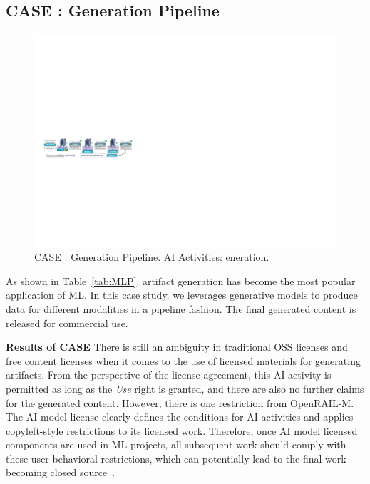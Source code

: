 \subsection{CASE  : Generation Pipeline}

\begin{figure}[h]
    \centering
    \includegraphics[width=\linewidth]{fig/case3.pdf}
    \caption{CASE : Generation Pipeline. AI Activities: eneration.}
    \Description{}
    \label{fig:case3}
\end{figure}

As shown in Table~\ref{tab:MLP}, artifact generation has become the most popular application of ML.
In this case study, we leverages generative models to produce data for different modalities in a pipeline fashion.
The final generated content is released for commercial use.

\textbf{Results of CASE }
There is still an ambiguity in traditional OSS licenses and free content licenses when it comes to the use of licensed materials for generating artifacts.
From the perspective of the license agreement, this AI activity is permitted as long as the \textit{Use} right is granted, and there are also no further claims for the generated content.
However, there is one restriction from OpenRAIL-M. 
The AI model license clearly defines the conditions for AI activities and applies copyleft-style restrictions to its licensed work. 
Therefore, once AI model licensed components are used in ML projects, all subsequent work should comply with these user behavioral restrictions, which can potentially lead to the final work becoming closed source~\cite{greenbaum2016the}.

